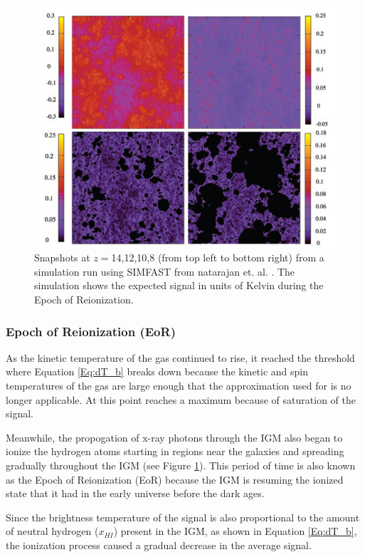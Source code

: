 \begin{figure}[htb]
\begin{center}
\includegraphics[width=0.95\linewidth]{Introduction/figures/reionization.jpg}
\caption{Snapshots at $z=$14,12,10,8 (from top left to bottom right) from a simulation run using SIMFAST from natarajan et. al. \cite{natarajan_2014}. The simulation shows the expected \dtb signal in units of Kelvin during the Epoch of Reionization. }
\label{Fig:eor}
\end{center}
\end{figure}

\subsubsection{Epoch of Reionization (EoR)}

As the kinetic temperature of the gas continued to rise, it reached the threshold where Equation \ref{Eq:dT_b} breaks down because the kinetic and spin temperatures of the gas are large enough that the approximation used for \tu is no longer applicable. At this point \dtb reaches a maximum because of saturation of the signal. 

Meanwhile, the propogation of x-ray photons through the IGM also began to ionize the hydrogen atoms starting in regions near the galaxies and spreading gradually throughout the IGM (see Figure \ref{Fig:eor}). This period of time is also known as the Epoch of Reionization (EoR) because the IGM is resuming the ionized state that it had in the early universe before the dark ages. 

Since the brightness temperature of the \cm signal is also proportional to the amount of neutral hydrogen ($x_{HI}$) present in the IGM, as shown in Equation \ref{Eq:dT_b}, the ionization process caused a gradual decrease in the average \cm signal. 


